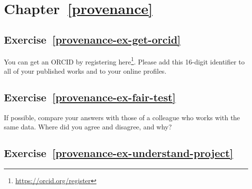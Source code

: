 \documentclass[
]{krantz}
\renewcommand{\href}[2]{#2\footnote{\url{#1}}}
\begin{document}
\hypertarget{chapter-refprovenance}{%
\section*{Chapter~\ref{provenance}}\label{chapter-refprovenance}}

\hypertarget{exercise-refprovenance-ex-get-orcid}{%
\subsection*{Exercise~\ref{provenance-ex-get-orcid}}\label{exercise-refprovenance-ex-get-orcid}}


You can get an ORCID by registering \href{https://orcid.org/register}{here}.
Please add this 16-digit identifier to all of your published works
and to your online profiles.

\hypertarget{exercise-refprovenance-ex-fair-test}{%
\subsection*{Exercise~\ref{provenance-ex-fair-test}}\label{exercise-refprovenance-ex-fair-test}}


If possible,
compare your answers with those of a colleague who works with the same data.
Where did you agree and disagree, and why?

\hypertarget{exercise-refprovenance-ex-understand-project}{%
\subsection*{Exercise~\ref{provenance-ex-understand-project}}\label{exercise-refprovenance-ex-understand-project}}
\end{document}
